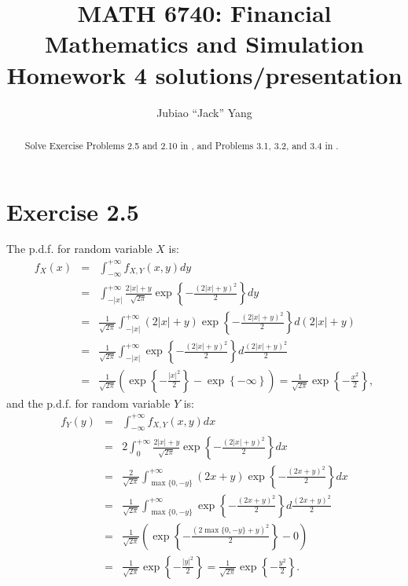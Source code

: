 \documentclass[final,3p,authoryear]{elsarticle}
\begin{document}
\begin{frontmatter}

\title{MATH 6740: Financial Mathematics and Simulation\\
	Homework 4 solutions/presentation}

\author[rvt]{Jubiao ``Jack'' Yang}

\address[rvt]{Rensselaer Polytechnic Institute, Troy, NY 12180}

\begin{abstract}
	Solve Exercise Problems 2.5 and 2.10 in \cite[Chapter 2]{shreve2004stochastic}, and Problems 3.1, 3.2, and 3.4 in \cite[Chapter 3]{shreve2004stochastic}.
\end{abstract}


\end{frontmatter}

\section{Exercise 2.5}
	The p.d.f. for random variable $X$ is:
	\begin{eqnarray}
		f_X(x) &=& \int_{-\infty}^{+\infty} f_{X,Y}(x,y) dy \nonumber\\
		&=& \int_{-\left|x\right|}^{+\infty} \frac{2\left|x\right|+y}{\sqrt{2\pi}} \exp\left\{-\frac{\left(2\left|x\right|+y\right)^2}{2}\right\} dy \nonumber\\
		&=& \frac{1}{\sqrt{2\pi}} \int_{-\left|x\right|}^{+\infty} \left(2\left|x\right|+y\right) \exp\left\{-\frac{\left(2\left|x\right|+y\right)^2}{2}\right\} d\left(2\left|x\right|+y\right) \nonumber\\
		&=& \frac{1}{\sqrt{2\pi}} \int_{-\left|x\right|}^{+\infty} \exp\left\{-\frac{\left(2\left|x\right|+y\right)^2}{2}\right\} d\frac{\left(2\left|x\right|+y\right)^2}{2} \nonumber\\
		&=& \frac{1}{\sqrt{2\pi}} \left( \exp\left\{-\frac{\left|x\right|^2}{2}\right\} - \exp\left\{ -\infty \right\} \right)
		= \frac{1}{\sqrt{2\pi}} \exp\left\{-\frac{x^2}{2}\right\}
		,
	\end{eqnarray}
	and the p.d.f. for random variable $Y$ is:
	\begin{eqnarray}
		f_Y(y) &=& \int_{-\infty}^{+\infty} f_{X,Y}(x,y) dx \nonumber\\
		&=& 2 \int_{0}^{+\infty} \frac{2\left|x\right|+y}{\sqrt{2\pi}} \exp\left\{-\frac{\left(2\left|x\right|+y\right)^2}{2}\right\} dx \nonumber\\
		&=& \frac{2}{\sqrt{2\pi}} \int_{\max\{0,-y\}}^{+\infty} \left(2x+y\right) \exp\left\{-\frac{\left(2x+y\right)^2}{2}\right\} dx \nonumber\\
		&=& \frac{1}{\sqrt{2\pi}} \int_{\max\{0,-y\}}^{+\infty} \exp\left\{-\frac{\left(2x+y\right)^2}{2}\right\} d\frac{\left(2x+y\right)^2}{2} \nonumber\\
		&=& \frac{1}{\sqrt{2\pi}} \left( \exp\left\{-\frac{\left(2\max\{0,-y\}+y\right)^2}{2}\right\} -0 \right) \nonumber\\
		&=& \frac{1}{\sqrt{2\pi}} \exp\left\{-\frac{\left|y\right|^2}{2}\right\}
		= \frac{1}{\sqrt{2\pi}} \exp\left\{-\frac{y^2}{2}\right\}
		.
	\end{eqnarray}
\end{document}
